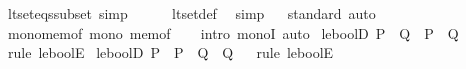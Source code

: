\begin{isabellebody}
\ lt{\isacharunderscore}{\kern0pt}set{\isacharunderscore}{\kern0pt}eq{\isacharunderscore}{\kern0pt}ssubset\ {\isacharbrackleft}{\kern0pt}simp{\isacharbrackright}{\kern0pt}{\isacharcolon}{\kern0pt}\ {\isachardoublequoteopen}{\isacharparenleft}{\kern0pt}{\isacharless}{\kern0pt}{\isacharparenright}{\kern0pt}\ {\isacharequal}{\kern0pt}\ {\isacharparenleft}{\kern0pt}{\isasymsubset}{\isacharparenright}{\kern0pt}{\isachardoublequoteclose}%
\isadelimproof
\ %
\endisadelimproof
%
\isatagproof
{}\isamarkupfalse%
\ lt{\isacharunderscore}{\kern0pt}set{\isacharunderscore}{\kern0pt}def\ \isamarkupfalse%
\ simp%
\endisatagproof
{\isafoldproof}%
%
\isadelimproof
%
\endisadelimproof
\isanewline
\isanewline
{}\isamarkupfalse%
%
\isadelimproof
\ %
\endisadelimproof
%
\isatagproof
{}\isamarkupfalse%
\ {\isacharparenleft}{\kern0pt}standard{\isacharparenright}{\kern0pt}\ auto%
\endisatagproof
{\isafoldproof}%
%
\isadelimproof
%
\endisadelimproof
\isanewline
\isanewline
{}\isamarkupfalse%
\isanewline
\isanewline
{}\isamarkupfalse%
\ mono{\isacharunderscore}{\kern0pt}mem{\isacharunderscore}{\kern0pt}of{\isacharcolon}{\kern0pt}\ {\isachardoublequoteopen}mono\ mem{\isacharunderscore}{\kern0pt}of{\isachardoublequoteclose}\isanewline
%
\isadelimproof
\ \ %
\endisadelimproof
%
\isatagproof
{}\isamarkupfalse%
\ {\isacharparenleft}{\kern0pt}intro\ monoI{\isacharparenright}{\kern0pt}\ auto%
\endisatagproof
{\isafoldproof}%
%
\isadelimproof
\isanewline
%
\endisadelimproof
\isanewline
{}\isamarkupfalse%
\ le{\isacharunderscore}{\kern0pt}boolD{\isacharprime}{\kern0pt}{\isacharcolon}{\kern0pt}\ {\isachardoublequoteopen}P\ {\isasymle}\ Q\ {\isasymLongrightarrow}\ P\ {\isasymLongrightarrow}\ Q{\isachardoublequoteclose}%
\isadelimproof
\ %
\endisadelimproof
%
\isatagproof
{}\isamarkupfalse%
\ {\isacharparenleft}{\kern0pt}rule\ le{\isacharunderscore}{\kern0pt}boolE{\isacharparenright}{\kern0pt}%
\endisatagproof
{\isafoldproof}%
%
\isadelimproof
%
\endisadelimproof
\isanewline
\isanewline
{}\isamarkupfalse%
\ le{\isacharunderscore}{\kern0pt}boolD{\isacharprime}{\kern0pt}{\isacharprime}{\kern0pt}{\isacharcolon}{\kern0pt}\ {\isachardoublequoteopen}P\ {\isasymLongrightarrow}\ P\ {\isasymle}\ Q\ {\isasymLongrightarrow}\ Q{\isachardoublequoteclose}%
\isadelimproof
\ %
\endisadelimproof
%
\isatagproof
{}\isamarkupfalse%
\ {\isacharparenleft}{\kern0pt}rule\ le{\isacharunderscore}{\kern0pt}boolE{\isacharparenright}{\kern0pt}%
\endisatagproof
{\isafoldproof}%
%
\isadelimproof
%
\endisadelimproof
\isanewline
\isanewline
%
\isadelimtheory
\isanewline
%
\endisadelimtheory
%
\isatagtheory
{}\isamarkupfalse%
%
\endisatagtheory
{\isafoldtheory}%
%
\isadelimtheory
%
\endisadelimtheory
%
\end{isabellebody}%

